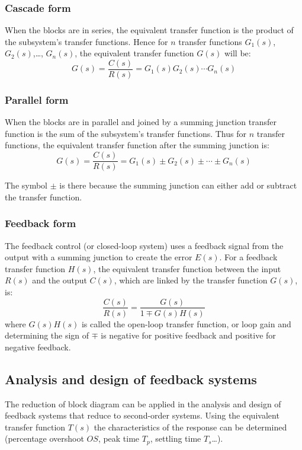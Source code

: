 \documentclass[10pt, twocolumn]{article}
\begin{document}
\subsubsection{Cascade form}
When the blocks are in series, the equivalent transfer function is the product of the subsystem's transfer functions.
Hence for \(n\) transfer functions \(G_1(s)\), \(G_2(s)\),\dots{}, \(G_n(s)\), the equivalent transfer function \(G(s)\) will be:
\[
  G(s) = \frac{C(s)}{R(s)} = G_1(s) G_2(s) \cdots G_n(s)
\]


\subsubsection{Parallel form}
When the blocks are in parallel and joined by a summing junction transfer function is the sum of the subsystem's transfer functions.
Thus for \(n\) transfer functions, the equivalent transfer function after the summing junction is:
\[
  G(s) = \frac{C(s)}{R(s)} = G_1(s) \pm G_2(s) \pm \cdots \pm G_n(s)
\]

\begin{remark}
  The symbol \(\pm\) is there because the summing junction can either add or subtract the transfer function.
\end{remark}


\subsubsection{Feedback form}
The feedback control (or closed-loop system) uses a feedback signal from the output with a summing junction to create the error \(E(s)\).
For a feedback transfer function \(H(s)\), the equivalent transfer function between the input \(R(s)\) and the output \(C(s)\), which are linked by the transfer function \(G(s)\), is:
\[
  \frac{C(s)}{R(s)} = \frac{G(s)}{1 \mp G(s)H(s)}
\]
where \(G(s)H(s)\) is called the open-loop transfer function, or loop gain and determining the sign of \(\mp\) is negative for positive feedback and positive for negative feedback.


\subsection{Analysis and design of feedback systems}
The reduction of block diagram can be applied in the analysis and design of feedback systems that reduce to second-order systems.
Using the equivalent transfer function \(T(s)\) the characteristics of the response can be determined (percentage overshoot \(OS\), peak time \(T_p\), settling time \(T_s\)\dots{}).
\end{document}
